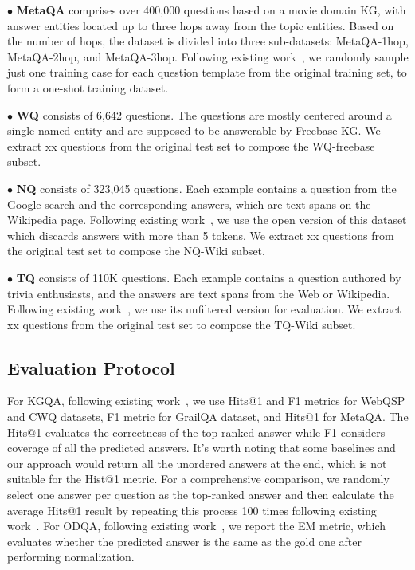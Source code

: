 $\bullet$ \textbf{MetaQA} comprises over 400,000 questions based on a movie domain KG, with answer entities located up to three hops away from
the topic entities. Based on the number of hops, the dataset is divided into three sub-datasets: MetaQA-1hop, MetaQA-2hop, and MetaQA-3hop. Following existing work~\cite{NSM}, we randomly sample just one training case for each question template from the original training set, to form a one-shot training dataset.

$\bullet$ \textbf{WQ} consists of 6,642 questions. The questions are mostly centered around a single named entity and are supposed to be answerable by Freebase KG. We extract xx questions from the original test set to compose the WQ-freebase subset.

$\bullet$ \textbf{NQ} consists of 323,045 questions. Each example contains a question from the Google search and the corresponding answers, which are text spans on the Wikipedia page. Following existing work~\cite{pack-knowledge}, we use the open version of this dataset which discards answers with more than 5 tokens. We extract xx questions from the original test set to compose the NQ-Wiki subset.

$\bullet$ \textbf{TQ} consists of 110K questions. Each example contains a question authored by trivia enthusiasts, and the answers are text spans from the Web or Wikipedia. Following existing work~\cite{pack-knowledge}, we use its unfiltered version for evaluation. We extract xx questions from the original test set to compose the TQ-Wiki subset.

\subsection{Evaluation Protocol} For KGQA, following existing work~\cite{GraftNet}, we use Hits@1 and F1 metrics for WebQSP and CWQ datasets, F1 metric for GrailQA dataset, and Hits@1 for MetaQA. The Hits@1 evaluates the correctness of the top-ranked answer while F1 considers coverage of all the predicted answers.
It's worth noting that some baselines and our approach would return all the unordered answers at the end, which is not suitable for the Hist@1 metric. For a comprehensive comparison, we randomly select one answer per question as the top-ranked answer and then calculate the average Hits@1 result by repeating this process 100 times following existing work~\cite{TIARA}.
For ODQA, following existing work~\cite{pack-knowledge}, we report the EM metric, which evaluates whether the predicted answer is the same as the gold one after performing normalization.

